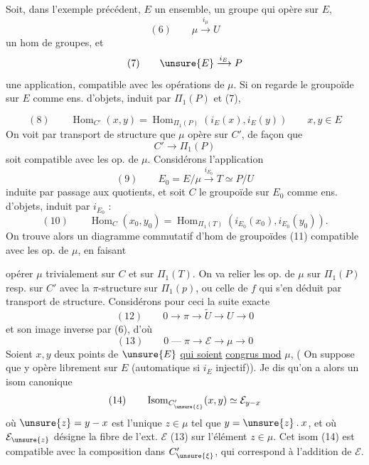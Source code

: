 Soit, dans l'exemple précédent, $E$ un ensemble,
\inserted{$\mu$} un groupe  qui opère sur
$E$,
\[
(6)\qquad \mu\xrightarrow{i_\mu}U
\]
un hom de groupes, et
\[
(7)\qquad \unsure{E}\xrightarrow{i_E}P
\]
une  application, compatible avec les
opérations de $\mu$. Si on regarde le  groupoïde
 sur $E$ comme ens. d'objets, induit par
$\Pi_1(P)$ et (7),

\[
(8)\qquad \operatorname{Hom}_{C'}(x,y)=\operatorname{Hom}_{\Pi_1(P)}(i_E(x),i_E(y))
\qquad x,y\in E
\]
On voit par transport de structure que
$\mu$ opère sur $C'$, de façon que
\[
C'\longrightarrow\Pi_1(P)
\]
soit compatible avec les op. de $\mu$.
Considérons l'application
\[
(9)\qquad E_0=E/\mu\xrightarrow{i_{E_0}}T\simeq P/U
\]
induite par passage aux quotients, et soit
 $C$ le groupoïde sur $E_0$ comme
ens. d'objets, induit par $i_{E_0}$ :
\[
(10)\qquad \operatorname{Hom}_C(x_0,y_0)=
\operatorname{Hom}_{\Pi_1(T)}(i_{E_0}(x_0),i_{E_0}(y_0)).
\]
On trouve alors un diagramme
commutatif d'hom de groupoïdes
\quad (11)
compatible avec les op. de $\mu$, en faisant

opérer $\mu$ trivialement sur $C$ et sur $\Pi_1(T)$.
On va relier les op. de $\mu$ sur $\Pi_1(P)$
resp. sur $C'$ avec la $\pi$-structure sur
$\Pi_1(p)$, ou celle de $f$ qui s'en déduit
par transport de structure. Considérons
pour ceci la suite exacte
\[
(12)\qquad 0\longrightarrow\pi\longrightarrow\widetilde U\longrightarrow U\longrightarrow0
\]
et son image inverse par (6), d'où
\[
(13)\qquad 0\mathbin{\text{---}}\pi\longrightarrow\mathcal E\longrightarrow\mu\longrightarrow0
\]
Soient $x,y$ deux points de $\unsure{E}$ \uline{qui soient}
\uline{congrus mod} $\mu$,
( On suppose que  \unsure{$\mu$} y
opère librement sur $E$ (automatique si $i_E$ injectif)).
Je dis qu'on a alors un isom canonique
\[
(14)\qquad \operatorname{Isom}_{C'_{\unsure{\xi}}}(x,y)\simeq\mathcal E_{y-x}
\]
où $\unsure{z}=y-x$ est l'unique $z\in\mu$ tel que
$y=\unsure{z}\mathbin{.}x$, et où $\mathcal E_{\unsure{z}}$ désigne la fibre de
l'ext. $\mathcal E$ (13) sur l'élément $z\in\mu$. Cet
isom (14) est compatible avec la composition
dans $C'_{\unsure{\xi}}$, qui correspond à l'addition de $\mathcal E$.

